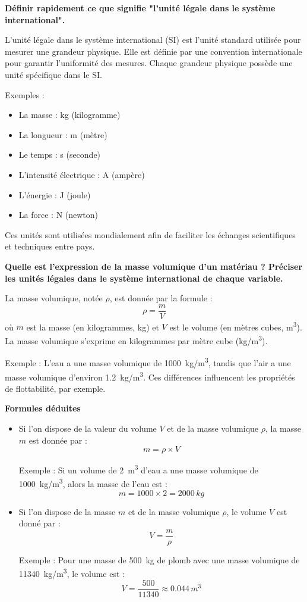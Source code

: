 \documentclass{exam}
\begin{document}
\begin{questions}
  \question[0.5] \textbf{Définir rapidement ce que signifie "l'unité légale dans le système international".}

  L'unité légale dans le système international (SI) est l'unité standard utilisée pour mesurer une grandeur physique. Elle est définie par une convention internationale pour garantir l'uniformité des mesures. Chaque grandeur physique possède une unité spécifique dans le SI.

  Exemples :
  \begin{itemize}
    \item La masse : \si{kg} (kilogramme)
    \item La longueur : \si{m} (mètre)
    \item Le temps : \si{s} (seconde)
    \item L'intensité électrique : \si{A} (ampère)
    \item L'énergie : \si{J} (joule)
    \item La force : \si{N} (newton)
  \end{itemize}
  Ces unités sont utilisées mondialement afin de faciliter les échanges scientifiques et techniques entre pays.

  \question[1] \textbf{Quelle est l'expression de la masse volumique d'un matériau ? Préciser les unités légales dans le système international de chaque variable.}

  La masse volumique, notée $\rho$, est donnée par la formule :
  \[
  \rho = \frac{m}{V}
  \]
  où $m$ est la masse (en kilogrammes, \si{kg}) et $V$ est le volume (en mètres cubes, \si{m^3}). La masse volumique s'exprime en kilogrammes par mètre cube (\si{kg/m^3}).

  Exemple : L'eau a une masse volumique de \SI{1000}{kg/m^3}, tandis que l'air a une masse volumique d'environ \SI{1.2}{kg/m^3}. Ces différences influencent les propriétés de flottabilité, par exemple.

  \question[1] \textbf{Formules déduites}

  \begin{itemize}
    \item Si l'on dispose de la valeur du volume $V$ et de la masse volumique $\rho$, la masse $m$ est donnée par :
    \[
    m = \rho \times V
    \] \par
    Exemple : Si un volume de \SI{2}{m^3} d'eau a une masse volumique de \SI{1000}{kg/m^3}, alors la masse de l'eau est :
    \[
    m = 1000 \times 2 = 2000\,\si{kg}
    \]
    \item Si l'on dispose de la masse $m$ et de la masse volumique $\rho$, le volume $V$ est donné par :
    \[
    V = \frac{m}{\rho}
    \] \par
    Exemple : Pour une masse de \SI{500}{kg} de plomb avec une masse volumique de \SI{11340}{kg/m^3}, le volume est :
    \[
    V = \frac{500}{11340} \approx 0.044\,\si{m^3}
    \]
  \end{itemize}


\end{questions}
\end{document}
